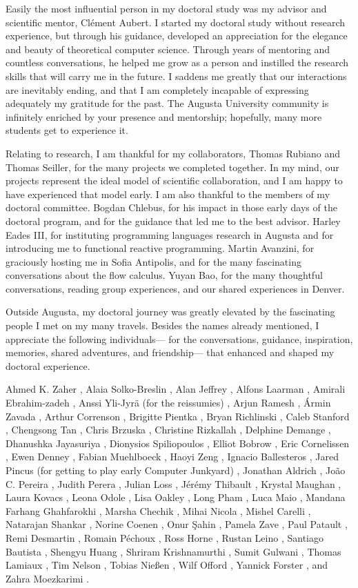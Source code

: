 Easily the most influential person in my doctoral study was my advisor and scientific mentor, Clément Aubert.
I started my doctoral study without research experience, but  through his guidance, developed an appreciation for the elegance and beauty of theoretical computer science.
Through years of mentoring and countless conversations, he helped me grow as a person and instilled the research skills that will carry me in the future.
I saddens me greatly that our interactions are inevitably ending, and that I am completely incapable of expressing adequately my gratitude for the past.
The Augusta University community is infinitely enriched by your presence and mentorship;
hopefully, many more students get to experience it.

Relating to research, I am thankful for my collaborators, Thomas Rubiano and Thomas Seiller, for the many projects we completed together.
In my mind, our projects represent the ideal model of scientific collaboration, and I am happy to have experienced that model early.
I am also thankful to the members of my doctoral committee.
Bogdan Chlebus, for his impact in those early days of the doctoral program, and for the guidance that led me to the best advisor.
Harley Eades III, for instituting programming languages research in Augusta and for introducing me to functional reactive programming.
Martin Avanzini, for graciously hosting me in Sofia Antipolis, and for the many fascinating conversations about the flow calculus.
Yuyan Bao, for the many thoughtful conversations, reading group experiences, and our shared experiences in Denver.

Outside Augusta, my doctoral journey was greatly elevated by the fascinating people I met on my many travels.
Besides the names already mentioned, I appreciate the following individuals---%
for the conversations, guidance, inspiration, memories, shared adventures, and friendship---%
that enhanced and shaped my doctoral experience.

Ahmed K. Zaher%
, Alaia Solko-Breslin%
, Alan Jeffrey%
, Alfons Laarman%
, Amirali Ebrahim\hyp{}zadeh%
, Anssi Yli-Jyrä (for the reissumies)%
, Arjun Ramesh%
, Ármin Zavada%
, Arthur Correnson%
, Brigitte Pientka%
, Bryan Richlinski%
, Caleb Stanford%
, Chengsong Tan%
, Chris Brzuska%
, Christine Rizkallah%
, Delphine Demange%
, Dhanushka Jayasuriya%
, Dionysios Spiliopoulos%
, Elliot Bobrow%
, Eric Cornelissen%
, Ewen Denney%
, Fabian Muehlboeck%
, Haoyi Zeng%
, Ignacio Ballesteros%
, Jared Pincus (for getting to play early Computer Junkyard)%
, Jonathan Aldrich%
, João C. Pereira%
, Judith Perera%
, Julian Loss%
, Jérémy Thibault%
, Krystal Maughan%
, Laura Kovacs%
, Leona Odole%
, Lisa Oakley%
, Long Pham%
, Luca Maio%
, Mandana Farhang Ghahfarokhi%
, Marsha Chechik%
, Mihai Nicola%
, Mishel Carelli%
, Natarajan Shankar%
, Norine Coenen%
, Onur Şahin%
, Pamela Zave%
, Paul Patault%
, Remi Desmartin%
, Romain Péchoux%
, Ross Horne%
, Rustan Leino%
, Santiago Bautista%
, Shengyu Huang%
, Shriram Krishnamurthi%
, Sumit Gulwani%
, Thomas Lamiaux%
, Tim Nelson%
, Tobias Nießen%
, Wilf Offord%
, Yannick Forster%
, and Zahra Moezkarimi%
.

